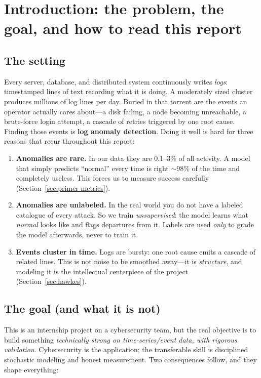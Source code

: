 \documentclass[11pt,a4paper]{article}
\newcommand{\keyword}[1]{\textbf{\color{accent}#1}}
\begin{document}
{\small\tableofcontents}
\clearpage

\section{Introduction: the problem, the goal, and how to read this report}
\label{sec:intro}

\subsection{The setting}
Every server, database, and distributed system continuously writes \emph{logs}:
timestamped lines of text recording what it is doing. A moderately sized cluster
produces millions of log lines per day. Buried in that torrent are the events an
operator actually cares about---a disk failing, a node becoming unreachable, a
brute-force login attempt, a cascade of retries triggered by one root cause.
Finding those events is \keyword{log anomaly detection}. Doing it well is hard
for three reasons that recur throughout this report:

\begin{enumerate}[nosep,leftmargin=1.5em]
  \item \textbf{Anomalies are rare.} In our data they are $0.1$--$3\%$ of all
  activity. A model that simply predicts ``normal'' every time is right $\sim
  98\%$ of the time and completely useless. This forces us to measure success
  carefully (Section~\ref{sec:primer-metrics}).
  \item \textbf{Anomalies are unlabeled.} In the real world you do not have a
  labeled catalogue of every attack. So we train \emph{unsupervised}: the model
  learns what \emph{normal} looks like and flags departures from it. Labels are
  used \emph{only} to grade the model afterwards, never to train it.
  \item \textbf{Events cluster in time.} Logs are bursty: one root cause emits a
  cascade of related lines. This is not noise to be smoothed away---it is
  \emph{structure}, and modeling it is the intellectual centerpiece of the
  project (Section~\ref{sec:hawkes}).
\end{enumerate}

\subsection{The goal (and what it is not)}
This is an internship project on a cybersecurity team, but the real objective is
to build something \emph{technically strong on time-series/event data, with
rigorous validation}. Cybersecurity is the application; the transferable skill
is disciplined stochastic modeling and honest measurement. Two consequences
follow, and they shape everything:
\end{document}
